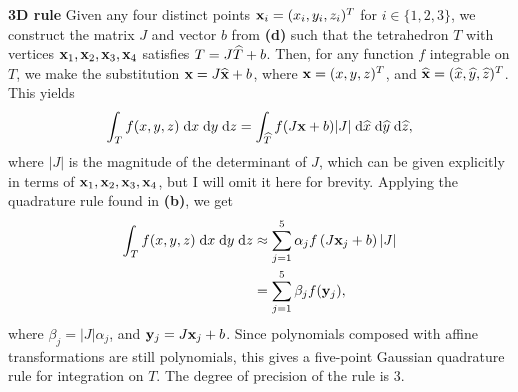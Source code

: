 \documentclass{homework}
\begin{document}
\begin{alphaparts}
		\textbf{3D rule}\; Given any four distinct points $\mathbf{x}_i = (x_i,y_i,z_i)^T$ for $i \in \{1,2,3\}$, we construct the matrix $J$ and vector $b$ from \textbf{(d)} such that the tetrahedron $T$ with vertices $\mathbf{x}_1,\mathbf{x}_2,\mathbf{x}_3,\mathbf{x}_4$ satisfies $T = J\widehat{T} + b$. Then, for any function $f$ integrable on $T$, we make the substitution $\mathbf{x} = J\widehat{\mathbf{x}} + b$, where $\mathbf{x} = (x,y,z)^T$, and $\widehat{\mathbf{x}}=(\widehat{x},\widehat{y},\widehat{z})^T$. This yields
		\begin{equation*}
			\int_Tf(x,y,z)\;\text{d} x \;\text{d} y \;\text{d} z = \int_{\widehat{T}}f(J\mathbf{x} + b)|J|\;\text{d} \widehat{x}\;\text{d}\widehat{y}\;\text{d}\widehat{z},
		\end{equation*}
		where $|J|$ is the magnitude of the determinant of $J$, which can be given explicitly in terms of $\mathbf{x}_1,\mathbf{x}_2,\mathbf{x}_3,\mathbf{x}_4$, but I will omit it here for brevity. Applying the quadrature rule found in \textbf{(b)}, we get
		\begin{align*}
			\int_Tf(x,y,z)\;\text{d} x \;\text{d} y \;\text{d} z &\approx \sum_{j=1}^5\alpha_jf\left(J\mathbf{x}_j + b\right)|J| \\
			&=\sum_{j=1}^5\beta_jf(\mathbf{y}_j),
		\end{align*}
		where $\beta_j = |J|\alpha_j$, and $\mathbf{y}_j = J\mathbf{x}_j + b$. Since polynomials composed with affine transformations are still polynomials, this gives a five-point Gaussian quadrature rule for integration on $T$. The degree of precision of the rule is 3.
		

\end{alphaparts}
\end{document}
